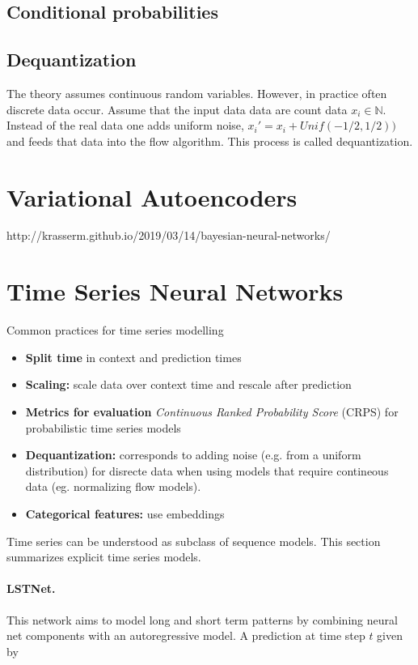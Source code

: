 \documentclass[12pt,a4paper]{article}
\begin{document}
\subsection{Conditional probabilities}
\cite{papamakarios_2017_maf}

\subsection{Dequantization}
The theory assumes continuous random variables. However, in practice often discrete data occur. Assume that the input data data are count data $x_i \in \mathbb{N}$. Instead of the real data one adds uniform noise, $x_i' =  x_i + Unif(-1/2, 1/2))$ and feeds that data into the flow algorithm. This process is called dequantization.

\section{Variational Autoencoders}
\cite{Kingma_2019_AnIntroductionToVariationalAutoencoders}
http://krasserm.github.io/2019/03/14/bayesian-neural-networks/


\section{Time Series Neural Networks}
Common practices for time series modelling
\begin{itemize}
	\item \textbf{Split time} in context and prediction times
	\item \textbf{Scaling:} scale data over context time and rescale after prediction
	\item \textbf{Metrics for evaluation} \textit{Continuous Ranked Probability Score} (CRPS) for probabilistic time series models
	\item \textbf{Dequantization:} corresponds to adding noise (e.g. from a uniform distribution) for disrecte data when using models that require contineous data (eg. normalizing flow models).
	\item \textbf{Categorical features:} use embeddings 
\end{itemize}
Time series can be understood as subclass of sequence models. This section summarizes explicit time series models.
\paragraph{LSTNet.} This network \cite{lstnet_2017} aims to model long and short term patterns by combining neural net components with an autoregressive model. A prediction at time step $t$ given by
\end{document}
